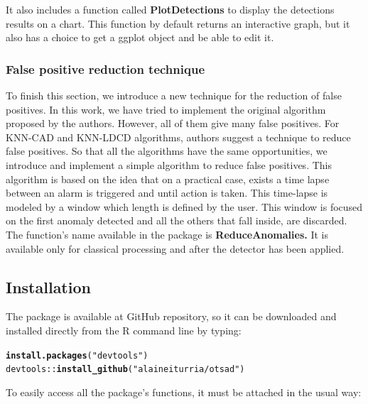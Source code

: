 \documentclass[a4paper]{article}\usepackage[]{graphicx}\usepackage[]{color}
\makeatletter
\newcommand{\hlstr}[1]{\textcolor[rgb]{0.192,0.494,0.8}{#1}}%
\newcommand{\hlopt}[1]{\textcolor[rgb]{0,0,0}{#1}}%
\newcommand{\hlstd}[1]{\textcolor[rgb]{0.345,0.345,0.345}{#1}}%
\newcommand{\hlkwd}[1]{\textcolor[rgb]{0.737,0.353,0.396}{\textbf{#1}}}%
\newenvironment{kframe}{%
 \def\at@end@of@kframe{}%
 \ifinner\ifhmode%
  \def\at@end@of@kframe{\end{minipage}}%
  \begin{minipage}{\columnwidth}%
 \fi\fi%
 \def\FrameCommand##1{\hskip\@totalleftmargin \hskip-\fboxsep
 \colorbox{shadecolor}{##1}\hskip-\fboxsep
     \hskip-\linewidth \hskip-\@totalleftmargin \hskip\columnwidth}%
 \MakeFramed {\advance\hsize-\width
   \@totalleftmargin\z@ \linewidth\hsize
   \@setminipage}}%
 {\par\unskip\endMakeFramed%
 \at@end@of@kframe}
\newenvironment{knitrout}{}{} %
\makeatother
\begin{document}
It also includes a function called \textbf{PlotDetections} to display the detections results on a chart. This function by default returns an interactive graph, but it also has a choice to get a ggplot object and be able to edit it.


\subsubsection{False positive reduction technique} \label{S:3.1.4}

To finish this section, we introduce a new technique for the reduction of false positives. In this work, we have tried to implement the original algorithm proposed by the authors. However, all of them give many false positives. For KNN-CAD \cite{2016arXiv160804585B} and KNN-LDCD \cite{2017arXiv170603412I} algorithms, authors suggest a technique to reduce false positives. So that all the algorithms have the same opportunities, we introduce and implement a simple algorithm to reduce false positives. This algorithm is based on the idea that on a practical case, exists a time lapse between an alarm is triggered and until action is taken. This time-lapse is modeled by a window which length is defined by the user. This window is focused on the first anomaly detected and all the others that fall inside, are discarded. The function's name available in the package is \textbf{ReduceAnomalies.} It is available only for classical processing and after the detector has been applied.

\subsection{Installation}\label{sec:installation}

The  package is available at GitHub repository, so it can be downloaded and installed directly from the R command line by typing:

\begin{knitrout}
\color{fgcolor}\begin{kframe}
\begin{alltt}
\hlkwd{install.packages}\hlstd{(}\hlstr{"devtools"}\hlstd{)}
\hlstd{devtools}\hlopt{::}\hlkwd{install_github}\hlstd{(}\hlstr{"alaineiturria/otsad"}\hlstd{)}
\end{alltt}
\end{kframe}
\end{knitrout}

To easily access all the package’s functions, it must be attached in the usual way:
\end{document}
